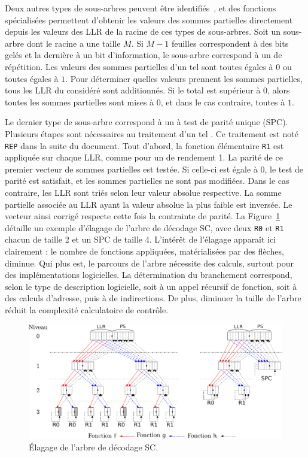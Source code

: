 Deux autres types de sous-arbres peuvent être identifiés~\cite{sarkis_fast_2014}, et des fonctions spécialisées permettent d'obtenir les valeurs des sommes partielles directement depuis les valeurs des LLR de la racine de ces types de sous-arbres. Soit un sous-arbre dont le \noeud racine a une taille $M$. Si $M-1$ feuilles correspondent à des bits gelés et la dernière à un bit d'information, le sous-arbre correspond à un \noeud de répétition. Les valeurs des sommes partielles d'un tel \noeud sont toutes égales à $0$ ou toutes égales à $1$. Pour déterminer quelles valeurs prennent les sommes partielles, tous les LLR du \noeud considéré sont additionnés. Si le total est supérieur à 0, alors toutes les sommes partielles sont mises à $0$, et dans le cas contraire, toutes à $1$.

Le dernier type de sous-arbre correspond à un \noeud à test de parité unique (SPC). Plusieurs étapes sont nécessaires au traitement d'un tel \noeud. Ce traitement est noté \texttt{REP} dans la suite du document. Tout d'abord, la fonction élémentaire \texttt{R1} est appliquée sur chaque LLR, comme pour un \noeud de rendement 1. La parité de ce premier vecteur de sommes partielles est testée. Si celle-ci est égale à 0, le test de parité est satisfait, et les sommes partielles ne sont pas modifiées. Dans le cas contraire, les LLR sont triés selon leur valeur absolue respective. La somme partielle associée au LLR ayant la valeur absolue la plus faible est inversée. Le vecteur ainsi corrigé respecte cette fois la contrainte de parité. La Figure~\ref{fig:sc_pruned} détaille un exemple d'élagage de l'arbre de décodage SC, avec deux \noeuds \texttt{R0} et \texttt{R1} chacun de taille 2 et un \noeud SPC de taille 4. L'intérêt de l'élagage apparaît ici clairement : le nombre de fonctions appliquées, matérialisées par des flèches, diminue. Qui plus est, le parcours de l'arbre nécessite des calculs, surtout pour des implémentations logicielles. La détermination du branchement correspond, selon le type de description logicielle, soit à un appel récursif de fonction, soit à des calculs d'adresse, puis à de indirections. De plus, diminuer la taille de l'arbre réduit la complexité calculatoire de contrôle.

\begin{figure}[h]
  \centering
  \includegraphics[width=\textwidth]{main/ch1_fig/sc_tree_pruned.pdf}
  \caption{\'Elagage de l'arbre de décodage SC.}
  \label{fig:sc_pruned}
\end{figure}

